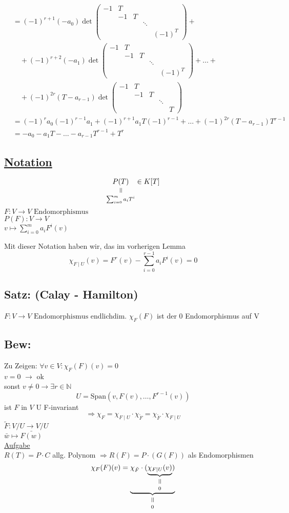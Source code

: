 \documentclass[titlepage,12pt,a4paper,ngerman]{report}
\newcommand{\verteq}{\rotatebox{90}{$\,=$}}
\newcommand{\equalto}[2]{\underset{\scriptstyle\overset{\mkern4mu\verteq}{#2}}{#1}}
\newcommand{\enph}{F: V \to V \textrm{ Endomorphismus}}
\begin{document}
\begin{align*}&= (-1)^{r+1} (-a_0) \det \begin{pmatrix}
-1 & T \\
& -1 & T \\
& & & \ddots \\
& & & & (-1) ^T
\end{pmatrix} + \\
& \quad + (-1)^{r+2} (-a_1) \det \begin{pmatrix}
-1 & T \\
& -1 & T \\
& & & \ddots \\
& & & & (-1) ^T
\end{pmatrix} + \dots + \\
& \quad + (-1)^{2r} (T-a_{r-1}) \det \begin{pmatrix}
-1 & T \\
& -1 & T \\
& & & \ddots \\
& & & & T
\end{pmatrix}\\
&= (-1)^r a_0 (-1)^{r-1} a_1 + (-1)^{r+1} a_1 T (-1)^{r-1} + \dots + (-1)^{2r} (T-a_{r-1}) T^{r-1}\\
& = -a_0 - a_1 T - \dots - a_{r-1} T^{r-1} + T^r 
\end{align*}

\noindent
\subsection*{\underline{Notation}}
$$\equalto{P(T)}{\sum^m_{i=0} a_i T^i} \in K[T]$$
$\enph$\\
$P(F): V\to V $\\
$ v\mapsto \sum^m_{i=0} a_i F^i(v)$

Mit dieser Notation haben wir, das im vorherigen Lemma
$$\chi_{F \mid U} (v) = F^r(v) - \sum^{r-1}_{i=0} a_i F^i(v) = 0$$
\subsection{Satz: (Calay - Hamilton)}
$\enph $ endlichdim.
$\chi_F(F)$ ist der 0 Endomorphismus auf V
\subsection{Bew:}
Zu Zeigen:
$\forall v\in V : \chi_F(F)(v) = 0$\\
\underline{$v=0$} $\rightarrow$ ok\\
sonst $v\neq 0 \rightarrow \exists r \in \mathbb{N}$
$$ U = \textrm{Span}(v,F(v), \dots, F^{r-1}(v))$$
ist $F$ in $V$
U F-invariant
$$\Rightarrow \chi_F = \chi_{F \mid U} \cdot \chi_{\tilde{F}} = \chi_{\tilde{F}} \cdot \chi_{F \mid U}$$
$\tilde{F}: V/U \to V/U$\\
$\bar{w} \mapsto \bar{F(w)}$\\
\underline{Aufgabe}\\
$R(T) = P \cdot C$ allg. Polynom
$\Rightarrow R(F) = P \cdot (G(F))$ als Endomorphismen
$$\chi_F(F)(v) = \equalto{\underbrace{\chi_{\tilde{F}} \cdot (\equalto{\underbrace{\chi_{F \mid U}(v)}}{0})}}{0} $$
\end{document}

